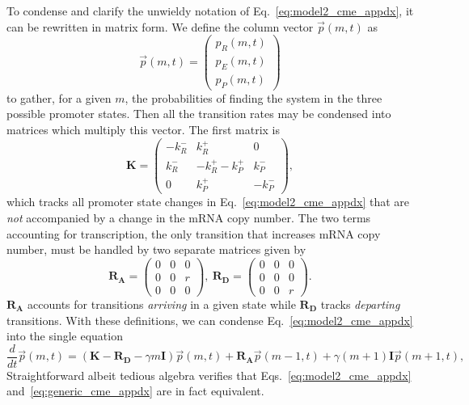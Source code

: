 To condense and clarify the unwieldy notation of Eq.~\ref{eq:model2_cme_appdx},
it can be rewritten in matrix form. We define the column vector $\vec{p}(m,t)$
as
\begin{equation}
\vec{p}(m,t)
= \begin{pmatrix} p_R(m,t) \\ p_E(m,t) \\ p_P(m,t) \end{pmatrix}
\end{equation}
to gather, for a given $m$, the probabilities of finding the system in the three
possible promoter states. Then all the transition rates may be condensed into
matrices which multiply this vector. The first matrix is
\begin{equation}
\mathbf{K} = \begin{pmatrix} -k_R^- & k_R^+ & 0 \\
                        k_R^- & -k_R^+ -k_P^+ & k_P^- \\
                        0 & k_P^+ & -k_P^- 
                \end{pmatrix},
\end{equation}
which tracks all promoter state changes in Eq.~\ref{eq:model2_cme_appdx} that
are \textit{not} accompanied by a change in the mRNA copy number. The two terms
accounting for transcription, the only transition that increases mRNA copy
number, must be handled by two separate matrices given by
\begin{equation}
\mathbf{R_A} = \begin{pmatrix}
                0 & 0 & 0 \\ 
                0 & 0 & r \\ 
                0 & 0 & 0
                \end{pmatrix},\
\mathbf{R_D} = \begin{pmatrix}
                0 & 0 & 0 \\ 
                0 & 0 & 0 \\ 
                0 & 0 & r
                \end{pmatrix}.
\end{equation}
$\mathbf{R_A}$ accounts for transitions \textit{arriving} in a given state while
$\mathbf{R_D}$ tracks \textit{departing} transitions. With these definitions, we
can condense Eq.~\ref{eq:model2_cme_appdx} into the single equation
\begin{equation}
\frac{d}{dt} \vec{p}(m,t) =
\left( \mathbf{K} - \mathbf{R_D} - \gamma m \mathbf{I} \right) \vec{p}(m,t)
                + \mathbf{R_A} \vec{p}(m-1,t) +
                \gamma (m+1) \mathbf{I} \vec{p}(m+1,t),
\label{eq:generic_cme_appdx}
\end{equation}
Straightforward albeit tedious algebra verifies that
Eqs.~\ref{eq:model2_cme_appdx} and~\ref{eq:generic_cme_appdx} are in fact
equivalent.


